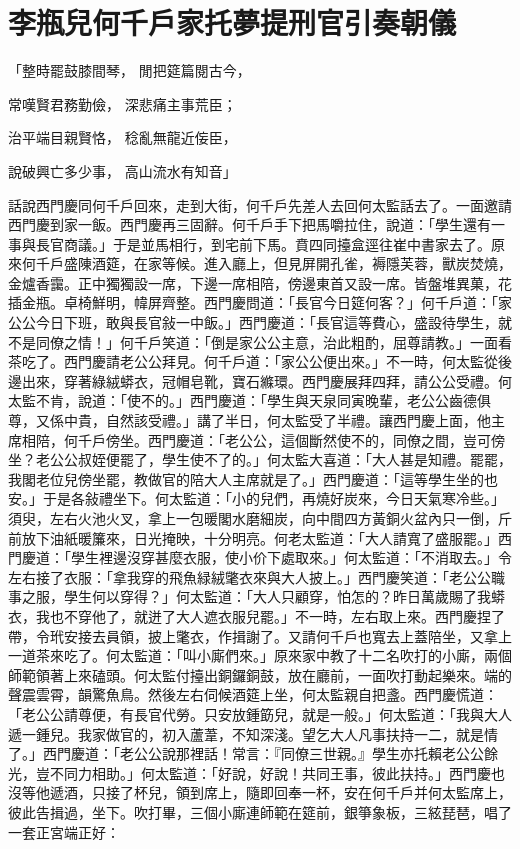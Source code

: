 %

\chapter{李瓶兒何千戶家托夢\KG 提刑官引奏朝儀}


「整時罷鼓膝間琴，  閒把筵篇閱古今，

常嘆賢君務勤儉，  深悲痛主事荒臣；

治平端目親賢恪，  稔亂無龍近侫臣，

說破興亡多少事，  高山流水有知音」

話說西門慶同何千戶回來，走到大街，何千戶先差人去回何太監話去了。一面邀請西門慶到家一飯。西門慶再三固辭。何千戶手下把馬嚼拉住，說道：「學生還有一事與長官商議。」于是並馬相行，到宅前下馬。賁四同擡盒逕往崔中書家去了。原來何千戶盛陳酒筵，在家等候。進入廳上，但見屏開孔雀，褥隱芙蓉，獸炭焚燒，金爐香靄。正中獨獨設一席，下邊一席相陪，傍邊東首又設一席。皆盤堆異菓，花插金瓶。卓椅鮮明，幃屏齊整。西門慶問道：「長官今日筵何客？」何千戶道：「家公公今日下班，敢與長官敍一中飯。」西門慶道：「長官這等費心，盛設待學生，就不是同僚之情！」何千戶笑道：「倒是家公公主意，治此粗酌，屈尊請教。」一面看茶吃了。西門慶請老公公拜見。何千戶道：「家公公便出來。」不一時，何太監從後邊出來，穿著綠絨蟒衣，冠帽皂靴，寶石縧環。西門慶展拜四拜，請公公受禮。何太監不肯，說道：「使不的。」西門慶道：「學生與天泉同寅晚輩，老公公齒德俱尊，又係中貴，自然該受禮。」講了半日，何太監受了半禮。讓西門慶上面，他主席相陪，何千戶傍坐。西門慶道：「老公公，這個斷然使不的，同僚之間，豈可傍坐？老公公叔姪便罷了，學生使不了的。」何太監大喜道：「大人甚是知禮。罷罷，我閣老位兒傍坐罷，教做官的陪大人主席就是了。」西門慶道：「這等學生坐的也安。」于是各敍禮坐下。何太監道：「小的兒們，再燒好炭來，今日天氣寒冷些。」須臾，左右火池火叉，拿上一包暖閣水磨細炭，向中間四方黃銅火盆內只一倒，斤前放下油紙暖簾來，日光掩映，十分明亮。何老太監道：「大人請寬了盛服罷。」西門慶道：「學生裡邊沒穿甚麼衣服，使小价下處取來。」何太監道：「不消取去。」令左右接了衣服：「拿我穿的飛魚緑絨氅衣來與大人披上。」西門慶笑道：「老公公職事之服，學生何以穿得？」何太監道：「大人只顧穿，怕怎的？昨日萬歲賜了我蟒衣，我也不穿他了，就迸了大人遮衣服兒罷。」不一時，左右取上來。西門慶捏了帶，令玳安接去員領，披上氅衣，作揖謝了。又請何千戶也寬去上蓋陪坐，又拿上一道茶來吃了。何太監道：「叫小廝們來。」原來家中教了十二名吹打的小廝，兩個師範領著上來磕頭。何太監付擡出銅鑼銅鼓，放在廳前，一面吹打動起樂來。端的聲震雲霄，韻驚魚鳥。然後左右伺候酒筵上坐，何太監親自把盞。西門慶慌道：「老公公請尊便，有長官代勞。只安放鍾筯兒，就是一般。」何太監道：「我與大人遞一鍾兒。我家做官的，初入蘆葦，不知深淺。望乞大人凡事扶持一二，就是情了。」西門慶道：「老公公說那裡話！常言：『同僚三世親。』學生亦托賴老公公餘光，豈不同力相助。」何太監道：「好說，好說！共同王事，彼此扶持。」西門慶也沒等他遞酒，只接了杯兒，領到席上，隨即回奉一杯，安在何千戶并何太監席上，彼此告揖過，坐下。吹打畢，三個小廝連師範在筵前，銀箏象板，三絃琵琶，唱了一套正宮端正好：

